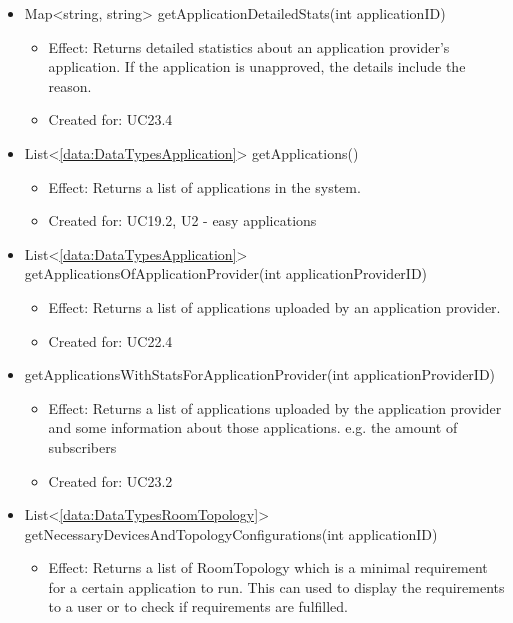 \begin{description}
\begin{itemize}[noitemsep,nolistsep,leftmargin=-.25cm]
      \item \textsf{Map\textless{}string, string\textgreater{} getApplicationDetailedStats(int applicationID)}
        \begin{itemize}[noitemsep,nolistsep]
           \item Effect: Returns detailed statistics about an application provider's application. If the application is unapproved, the details include the reason.
\item Created for: UC23.4
        \end{itemize}
      \item \textsf{List\textless{}\ref{data:DataTypesApplication}\textgreater{} getApplications()}
        \begin{itemize}[noitemsep,nolistsep]
           \item Effect: Returns a list of applications in the system.
\item Created for: UC19.2, U2 - easy applications
        \end{itemize}
      \item \textsf{List\textless{}\ref{data:DataTypesApplication}\textgreater{} getApplicationsOfApplicationProvider(int applicationProviderID)}
        \begin{itemize}[noitemsep,nolistsep]
           \item Effect: Returns a list of applications uploaded by an application provider.
\item Created for: UC22.4
        \end{itemize}
      \item \textsf{ getApplicationsWithStatsForApplicationProvider(int applicationProviderID)}
        \begin{itemize}[noitemsep,nolistsep]
           \item Effect: Returns a list of applications uploaded by the application provider and some information about those applications. e.g. the amount of subscribers
\item Created for: UC23.2
        \end{itemize}
      \item \textsf{List\textless{}\ref{data:DataTypesRoomTopology}\textgreater{} getNecessaryDevicesAndTopologyConfigurations(int applicationID)}
        \begin{itemize}[noitemsep,nolistsep]
           \item Effect: Returns a list of RoomTopology which is a minimal requirement for a certain application to run. This can used to display the requirements to a user or to check if requirements are fulfilled.

\end{itemize}
\end{itemize}
\end{description}
